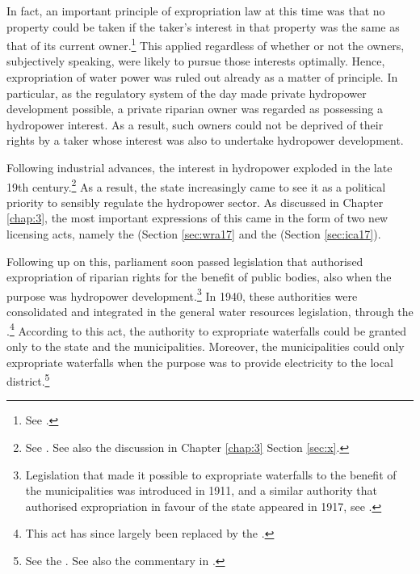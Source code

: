 In fact, an important principle of expropriation law at this time was that no property could be taken if the taker's interest in that property was the same as that of its current owner.\footnote{See \cite[168-170]{dahl88}.} This applied regardless of whether or not the owners, subjectively speaking, were likely to pursue those interests optimally. Hence, expropriation of water power was ruled out already as a matter of principle. In particular, as the regulatory system of the day made private hydropower development possible, a private riparian owner was regarded as possessing a hydropower interest. As a result, such owners could not be deprived of their rights by a taker whose interest was also to undertake hydropower development.

Following industrial advances, the interest in hydropower exploded in the late 19th century.\footnote{See \cite[58-59]{falkanger87}. See also the discussion in Chapter \ref{chap:3} Section \ref{sec:x}.} As a result, the state increasingly came to see it as a political priority to sensibly regulate the hydropower sector. As discussed in Chapter \ref{chap:3}, the most important expressions of this came in the form of two new licensing acts, namely the \cite{wra17} (Section \ref{sec:wra17} and the \cite{ica17} (Section \ref{sec:ica17}).


Following up on this, parliament soon passed legislation that authorised expropriation of riparian rights for the benefit of public bodies, also when the purpose was hydropower development.\footnote{Legislation that made it possible to expropriate waterfalls to the benefit of the municipalities was introduced in 1911, and a similar authority that authorised expropriation in favour of the state appeared in 1917, see \cite[29]{amundsen28}.} In 1940, these authorities were consolidated and integrated in the general water resources legislation, through the \cite{wra40}.\footnote{This act has since largely been replaced by the \cite{wra00}.} According to this act, the authority to expropriate waterfalls could be granted only to the state and the municipalities. Moreover, the municipalities could only expropriate waterfalls when the purpose was to provide electricity to the local district.\footnote{See the \cite[148]{wra40}. See also the commentary in \cite[201-210]{sorensen41}.}

